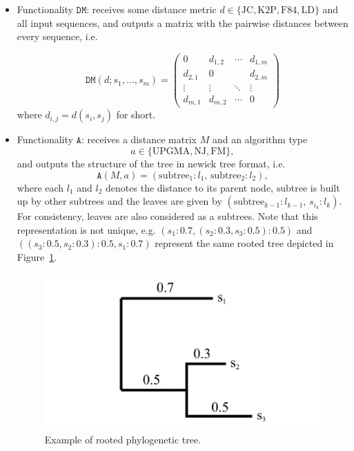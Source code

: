 \begin{itemize}
    \item Functionality $\mathtt{DM}$: receives some distance metric $d\in\{\text{JC}, \text{K2P}, \text{F84}, \text{LD}\}$ and all input sequences, and outputs a matrix with the pairwise distances between every sequence, i.e. 
    
    \begin{equation*}
        \mathtt{DM}(d; s_1, ..., s_m) = \begin{pmatrix}
                        0 & d_{1,2} & \cdots  & d_{1, m}\\
                        d_{2,1} & 0 &        &  d_{2, m} \\
                        \vdots &  \vdots  & \ddots &  \vdots \\
                        d_{m,1} & d_{m,2} &   \cdots   &  0
                        \end{pmatrix}
    \end{equation*}
    where $d_{i,j} = d(s_i, s_j)$ for short.
    
    \item Functionality $\mathtt{A}$: receives a distance matrix $M$ and an algorithm type
    $$a \in \{\text{UPGMA}, \text{NJ}, \text{FM}\},$$ and outputs the structure of the tree in newick tree format, i.e.
    $$\mathtt{A}(M, a) = (\text{subtree}_1:l_1,\, \text{subtree}_2:l_2),$$
    where each $l_1$ and $l_2$ denotes the distance to its parent node, $\text{subtree}$ is built up by other subtrees and the leaves are given by $(\text{subtree}_{k-1}:l_{k-1},\, s_{i_k}:l_k)$. For consistency, leaves are also considered as a subtrees. Note that this representation is not unique, e.g. $(s_1:0.7, (s_2:0.3, s_3:0.5):0.5)$ and $((s_3:0.5, s_2:0.3):0.5, s_1:0.7)$ represent the same rooted tree depicted in Figure~\ref{fig:tree}. 
    
    \begin{figure}[h]
        \centering
        \includegraphics[scale=0.4]{Chapter_PrivatePhylogeneticTrees/tree.png}
        \caption{Example of rooted phylogenetic tree.}
        \label{fig:tree}
    \end{figure}
    

\end{itemize}
